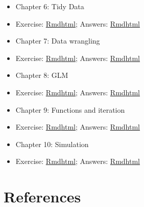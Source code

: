 \documentclass[
  oneside]{book}
\begin{document}
\begin{itemize}
\item
  Chapter 6: Tidy Data
\item
  Exercise: \href{exercises/06_tidyr_exercise.Rmd}{Rmd}\textbar{}\href{exercises/06_tidyr_exercise.html}{html}; Answers: \href{exercises/06_tidyr_answers.Rmd}{Rmd}\textbar{}\href{exercises/06_tidyr_answers.html}{html}
\item
  Chapter 7: Data wrangling
\item
  Exercise: \href{exercises/07_dplyr_exercise.Rmd}{Rmd}\textbar{}\href{exercises/07_dplyr_exercise.html}{html}; Answers: \href{exercises/07_dplyr_answers.Rmd}{Rmd}\textbar{}\href{exercises/07_dplyr_answers.html}{html}
\item
  Chapter 8: GLM
\item
  Exercise: \href{exercises/08_glm_exercise.Rmd}{Rmd}\textbar{}\href{exercises/08_glm_exercise.html}{html}; Answers: \href{exercises/08_glm_answers.Rmd}{Rmd}\textbar{}\href{exercises/08_glm_answers.html}{html}
\item
  Chapter 9: Functions and iteration
\item
  Exercise: \href{exercises/09_func_exercise.Rmd}{Rmd}\textbar{}\href{exercises/09_func_exercise.html}{html}; Answers: \href{exercises/09_func_answers.Rmd}{Rmd}\textbar{}\href{exercises/09_func_answers.html}{html}
\item
  Chapter 10: Simulation
\item
  Exercise: \href{exercises/10_sim_exercise.Rmd}{Rmd}\textbar{}\href{exercises/10_sim_exercise.html}{html}; Answers: \href{exercises/10_sim_answers.Rmd}{Rmd}\textbar{}\href{exercises/10_sim_answers.html}{html}
\end{itemize}

\hypertarget{bookrefs}{%
\chapter{References}\label{bookrefs}}

  
\end{document}
